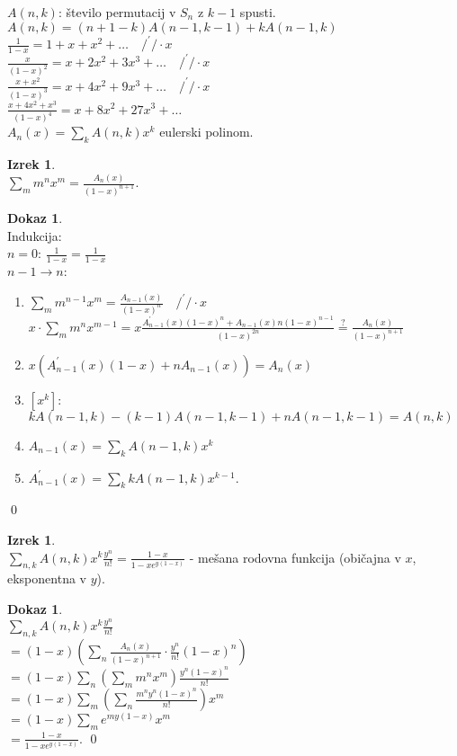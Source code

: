 \documentclass[a4paper, 12pt]{book}
\theoremstyle{definition}
\newtheorem{theorem}[counter]{Izrek}
\newtheorem{pro}[counter]{Dokaz}
\theoremstyle{remark}
\begin{document}
$A(n,k)$: število permutacij v $S_n$ z $k-1$ spusti. \\
$A(n,k) = (n+1-k) A(n-1,k-1) + k A(n-1,k)$ \\
$\frac{1}{1-x} = 1 + x + x^2 + \dots \quad /^{'} / \cdot x$ \\
$\frac{x}{(1-x)^2} = x + 2x^2 + 3x^3 + \dots \quad /^{'} / \cdot x$ \\
$\frac{x+x^2}{(1-x)^3} = x + 4x^2 + 9x^3 + \dots \quad /^{'} / \cdot x$ \\
$\frac{x+4x^2+x^3}{(1-x)^4} = x + 8x^2 + 27x^3 + \dots$ \\
$A_n(x) = \sum_k A(n,k) x^k$ eulerski polinom.
\begin{theorem} \text{} \\
  $\sum_m m^n x^m = \frac{A_n(x)}{(1-x)^{n+1}}$.
\end{theorem}
\begin{pro} \text{} \\
  Indukcija: \\
  $n=0$: $\frac{1}{1-x} = \frac{1}{1-x}$ \\
  $n-1 \to n$:
  \begin{enumerate}[label={}]
    \item $\sum_m m^{n-1} x^m = \frac{A_{n-1}(x)}{(1-x)^n} \quad /^{'} / \cdot x$ \\
      $x \cdot \sum_m m^{n} x^{m-1} = x \frac{A_{n-1}^{'}(x)(1-x)^n + A_{n-1}(x)n(1-x)^{n-1}}{(1-x)^{2n}}
      \stackrel{?}{=} \frac{A_n(x)}{(1-x)^{n+1}}$
    \item $x (A_{n-1}^{'}(x)(1-x) + n A_{n-1}(x)) = A_n(x)$
    \item $[x^k]$: $k A(n-1,k) - (k-1) A(n-1,k-1) + n A(n-1,k-1) = A(n,k)$ \checkmark
    \item $A_{n-1}(x) = \sum_k A(n-1,k) x^k$
    \item $A_{n-1}^{'}(x) = \sum_k k A(n-1,k) x^{k-1}$.
  \end{enumerate}
  \qed
\end{pro}
\begin{theorem} \text{} \\
  $\sum_{n,k} A(n,k) x^k \frac{y^n}{n!} = \frac{1-x}{1-x e^{y(1-x)}}$ -
  mešana rodovna funkcija (običajna v $x$, eksponentna v $y$).
\end{theorem}
\begin{pro} \text{} \\
  $\sum_{n,k} A(n,k) x^k \frac{y^n}{n!} $ \\
  $= (1-x) \left( \sum_n \frac{A_n(x)}{(1-x)^{n+1}} \cdot \frac{y^n}{n!} (1-x)^n\right)$ \\
  $= (1-x)\sum_n \left( \sum_m m^n x^m \right) \frac{y^n (1-x)^n}{n!}$ \\
  $= (1-x) \sum_m \left( \sum_n \frac{m^n y^n (1-x)^n}{n!} \right) x^m$ \\
  $= (1-x) \sum_m e^{my(1-x)} x^m$ \\
  $= \frac{1-x}{1 - xe^{y(1-x)}}$.
  \qed
\end{pro}
\end{document}
